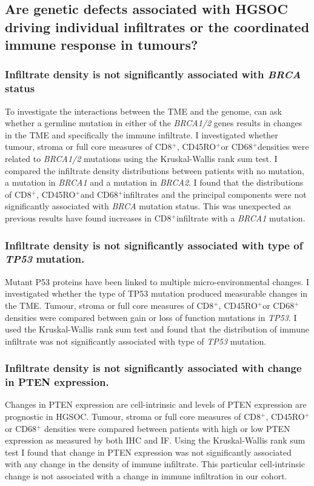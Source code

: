 \subsection{Are genetic defects associated with HGSOC driving individual infiltrates or the coordinated immune response in tumours?}

\subsubsection*{Infiltrate density is not significantly associated with \textit{BRCA} status}
To investigate the interactions between the TME and the genome, can ask whether a germline mutation in either of the \textit{BRCA1/2} genes results in changes in the TME and specifically the immune infiltrate. I investigated whether tumour, stroma or full core measures of CD8$^+$, CD45RO$^+$or CD68$^+$densities were related to \textit{BRCA1/2} mutations using the Kruskal-Wallis rank sum test. I compared the infiltrate density distributions between patients with no mutation, a mutation in \textit{BRCA1} and a mutation in \textit{BRCA2}. I found that the distributions of CD8$^+$, CD45RO$^+$and CD68$^+$infiltrates and the principal components were not significantly associated with \textit{BRCA} mutation status. This was unexpected as previous results have found increases in CD8$^+$infiltrate with a \textit{BRCA1} mutation\cite{Clarke2009}.

\subsubsection{Infiltrate density is not significantly associated with type of \textit{TP53} mutation.}
Mutant P53 proteins have been linked to multiple micro-environmental changes\cite{Cordani2016}. I investigated whether the type of TP53 mutation produced measurable changes in the TME. Tumour, stroma or full core measures of CD8$^+$, CD45RO$^+$or CD68$^+$densities were compared between gain or loss of function mutations in \textit{TP53}. I used the Kruskal-Wallis rank sum test and found that the distribution of immune infiltrate was not significantly associated with type of \textit{TP53} mutation.

\subsubsection{Infiltrate density is not significantly associated with change in PTEN expression.}
Changes in PTEN expression are cell-intrinsic and levels of PTEN expression are prognostic in HGSOC\cite{RN17, RN15}. Tumour, stroma or full core measures of CD8$^+$, CD45RO$^+$ or CD68$^+$ densities were compared between patients with high or low PTEN expression as measured by both IHC and IF. Using the Kruskal-Wallis rank sum test I found that change in PTEN expression was not significantly associated with any change in the density of immune infiltrate. This particular cell-intrinsic change is not associated with a change in immune infiltration in our cohort.

